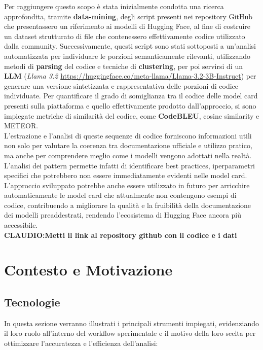 \documentclass{article}
\begin{document}
Per raggiungere questo scopo è stata inizialmente condotta una ricerca approfondita, tramite \textbf{data-mining}, degli script presenti nei repository GitHub che presentassero un riferimento ai modelli di Hugging Face, al fine di costruire un dataset strutturato di file che contenessero effettivamente codice utilizzato dalla community. Successivamente, questi script sono stati sottoposti a un’analisi automatizzata per individuare le porzioni semanticamente rilevanti, utilizzando metodi di \textbf{parsing} del codice e tecniche di \textbf{clustering}, per poi servirsi di un \textbf{LLM} (\textit{Llama 3.2} \url{https://huggingface.co/meta-llama/Llama-3.2-3B-Instruct})  per generare una versione sintetizzata e rappresentativa delle porzioni di codice individuate. Per quantificare il grado di somiglianza tra il codice delle model card presenti sulla piattaforma e quello effettivamente prodotto dall'approccio, si sono impiegate metriche di similarità del codice, come \textbf{CodeBLEU}, cosine similarity e METEOR.\\
L’estrazione e l’analisi di queste sequenze di codice forniscono informazioni utili non solo per valutare la coerenza tra documentazione ufficiale e utilizzo pratico, ma anche per comprendere meglio come i modelli vengono adottati nella realtà. L’analisi dei pattern permette infatti di identificare best practices, iperparametri specifici che potrebbero non essere immediatamente evidenti nelle model card.\\
L’approccio sviluppato potrebbe anche essere utilizzato in futuro per arricchire automaticamente le model card che attualmente non contengono esempi di codice, contribuendo a migliorare la qualità e la fruibilità della documentazione dei modelli preaddestrati, rendendo l’ecosistema di Hugging Face ancora più accessibile.\\

\textbf{CLAUDIO:Metti il link al repository github con il codice e i dati}

\section{Contesto e Motivazione}
\subsection{Tecnologie}
In questa sezione verranno illustrati i principali strumenti impiegati, evidenziando il loro ruolo all'interno del workflow sperimentale e il motivo della loro scelta per ottimizzare l'accuratezza e l'efficienza dell’analisi:
\end{document}
